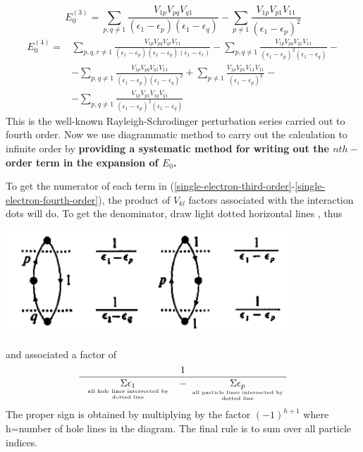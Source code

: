\begin{equation}E_{0}^{(3)}=\sum_{p, q \neq 1} \frac{V_{1 p} V_{p q} V_{q 1}}{\left(\epsilon_{1}-\epsilon_{p}\right)\left(\epsilon_{1}-\epsilon_{q}\right)}-\sum_{p \neq 1} \frac{V_{1p}V_{p1} V_{11}}{\left(\epsilon_{1}-\epsilon_{p}\right)^{2}}
\label{single-electron-third-order}
\end{equation}
\begin{equation}
\begin{aligned}
E_{0}^{(4)}=& \sum_{p, q, r \neq 1} \frac{V_{1 p} V_{p q} V_{q r} V_{r 1}}{\left(\epsilon_{1}-\epsilon_{p}\right)\left(\epsilon_{1}-\epsilon_{q}\right)\left(\epsilon_{1}-\epsilon_{r}\right)}-\sum_{p, q \neq1} \frac{V_{1p} V_{p q} V_{q 1} V_{11}}{\left(\epsilon_{1}-\epsilon_{p}\right)^{2}\left(\epsilon_{1}-\epsilon_{q}\right)}-\\
&-\sum_{p, q \neq 1} \frac{V_{1 p} V_{p q} V_{q 1} V_{11}}{\left(\epsilon_{1}-\epsilon_{p}\right)\left(\epsilon_{1}-\epsilon_{q}\right)^{2}}+\sum_{p \neq 1} \frac{V_{1p} V_{p 1} V_{11} V_{11}}{\left(\epsilon_{1}-\epsilon_{p}\right)^{3}}-\\
&-\sum_{p, q \neq 1} \frac{V_{1 p} V_{p 1} V_{1 q} V_{q 1}}{\left(\epsilon_{1}-\epsilon_{p}\right)^{2}\left(\epsilon_{1}-\epsilon_{q}\right)}
\end{aligned}
\label{single-electron-fourth-order}
\end{equation}
This is the well-known Rayleigh-Schrodinger perturbation series carried out to fourth order. Now we use diagrammatic method to carry out the calculation to infinite order by \textbf{providing a systematic method for writing out the $nth-$order term in the expansion of $E_0$.}
\begin{imp}
To get the numerator of each term in (\ref{single-electron-third-order}-\ref{single-electron-fourth-order}), the product of $V_{kl}$ factors associated with the interaction dots will do. To get the denominator, draw light dotted horizontal lines , thus
\begin{center}
    \includegraphics[width=0.8\textwidth]{screenshots/single-electron-denominator-rule.PNG}
\end{center}
and associated a factor of
\begin{equation}
    \frac{1}{\underset{\parbox{100pt}{\centering\tiny{all hole lines intersected by dotted line}}}{\Sigma \epsilon_1}-\underset{\parbox{100pt}{\centering\tiny{all particle lines intersected by dotted line}}}{\Sigma\epsilon_p}}
\end{equation}
The proper sign is obtained by multiplying by the factor $(-1)^{h+1}$ where h=number of hole lines in the diagram. The final rule is to sum over all particle indices.
\end{imp}
